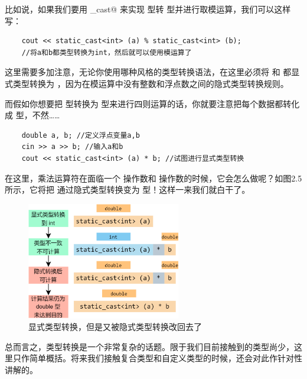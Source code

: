 比如说，如果我们要用 \lstinline@static_cast@ 来实现 \lstinline@double@ 型转 \lstinline@int@ 型并进行取模运算，我们可以这样写：
\begin{lstlisting}
    cout << static_cast<int> (a) % static_cast<int> (b);
    //将a和b都类型转换为int，然后就可以使用模运算了
\end{lstlisting}
这里需要多加注意，无论你使用哪种风格的类型转换语法，在这里必须将 \lstinline@a@ 和 \lstinline@b@ 都显式类型转换为 \lstinline@int@，因为在模运算中没有整数和浮点数之间的隐式类型转换规则。\par
而假如你想要把 \lstinline@double@ 型转换为 \lstinline@int@ 型来进行四则运算的话，你就要注意把每个数据都转化成 \lstinline@int@ 型，不然……
\begin{lstlisting}
    double a, b; //定义浮点变量a,b
    cin >> a >> b; //输入a和b
    cout << static_cast<int> (a) * b; //试图进行显式类型转换
\end{lstlisting}
在这里，乘法运算符在面临一个 \lstinline@int@ 操作数和 \lstinline@double@ 操作数的时候，它会怎么做呢？如图2.5所示，它将把 \lstinline@int@ 通过隐式类型转换变为 \lstinline@double@ 型！这样一来我们就白干了。\par
\begin{figure}[htbp]
    \centering
    \includegraphics[width=0.6\textwidth]{../images/generalized_parts/02_Explicit_type_cast_from_double_to_int_in_vain.drawio.png}
    \caption{显式类型转换，但是又被隐式类型转换改回去了}
\end{figure}
总而言之，类型转换是一个非常复杂的话题。限于我们目前接触到的类型尚少，这里只作简单概括。将来我们接触复合类型和自定义类型的时候，还会对此作针对性讲解的。\par

